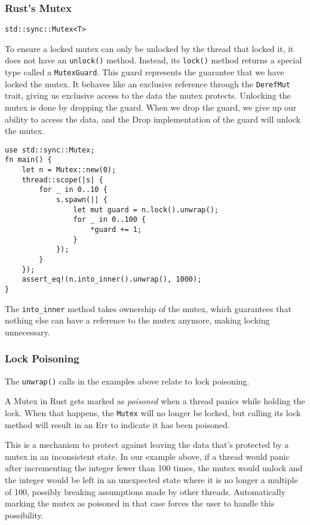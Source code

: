 \documentclass[11pt]{article}
\begin{document}
\subsubsection{Rust's Mutex}
\label{sec:orgfa7e57c}
\texttt{std::sync::Mutex<T>}

To ensure a locked mutex can only be unlocked by the thread that locked it, it does not have an
\texttt{unlock()} method. Instead, its \texttt{lock()} method returns a special type called a \texttt{MutexGuard}. This
guard represents the guarantee that we have locked the mutex. It behaves like an exclusive
reference through the \texttt{DerefMut} trait, giving us exclusive access to the data the mutex protects.
Unlocking the mutex is done by dropping the guard. When we drop the guard, we give up our
ability to access the data, and the Drop implementation of the guard will unlock the mutex.

\begin{verbatim}
use std::sync::Mutex;
fn main() {
    let n = Mutex::new(0);
    thread::scope(|s| {
        for _ in 0..10 {
            s.spawn(|| {
                let mut guard = n.lock().unwrap();
                for _ in 0..100 {
                    *guard += 1;
                }
            });
        }
    });
    assert_eq!(n.into_inner().unwrap(), 1000);
}
\end{verbatim}

The \texttt{into\_inner} method takes ownership of the mutex, which guarantees that nothing else can have a
reference to the mutex anymore, making locking unnecessary.
\subsubsection{Lock Poisoning}
\label{sec:org98b04ac}
The \texttt{unwrap()} calls in the examples above relate to lock poisoning.

A Mutex in Rust gets marked as \emph{poisoned} when a thread panics while holding the lock. When that
happens, the \texttt{Mutex} will no longer be locked, but calling its lock method will result in an Err
to indicate it has been poisoned.

This is a mechanism to protect against leaving the data that’s protected by a mutex in an
inconsistent state. In our example above, if a thread would panic after incrementing the integer
fewer than 100 times, the mutex would unlock and the integer would be left in an unexpected
state where it is no longer a multiple of 100, possibly breaking assumptions made by other
threads. Automatically marking the mutex as poisoned in that case forces the user to handle this
possibility.
\end{document}

